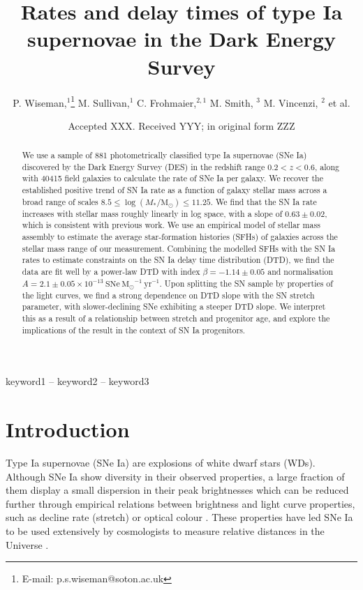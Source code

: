 \documentclass[fleqn,usenatbib]{mnras}
\title[Rates of SNe Ia in DES]{Rates and delay times of type Ia supernovae in the Dark Energy Survey}
\author[P. Wiseman et al.]{
P. Wiseman,$^{1}$\thanks{E-mail: p.s.wiseman@soton.ac.uk}
M. Sullivan,$^{1}$
C. Frohmaier,$^{2,1}$
M. Smith, $^{3}$
M. Vincenzi, $^{2}$
et al.
\\
}
\date{Accepted XXX. Received YYY; in original form ZZZ}
\begin{document}
\label{firstpage}
\pagerange{\pageref{firstpage}--\pageref{lastpage}}
\maketitle

\begin{abstract}
We use a sample of 881 photometrically classified type Ia supernovae (SNe Ia) discovered by the Dark Energy Survey (DES) in the redshift range $0.2 < z <0.6$, along with 40415 field galaxies to calculate the rate of SNe Ia per galaxy. We recover the established positive trend of SN Ia rate as a function of galaxy stellar mass across a broad range of scales $8.5 \leq \log(M_*/\mathrm{M}_{\odot}) \leq 11.25$. We find that the SN Ia rate increases with stellar mass roughly linearly in log space, with a slope of $0.63 \pm 0.02$, which is consistent with previous work. We use an empirical model of stellar mass assembly to estimate the average star-formation histories (SFHs) of galaxies across the stellar mass range of our measurement. Combining the modelled SFHs with the SN Ia rates to estimate constraints on the SN Ia delay time distribution (DTD), we find the data are fit well by a power-law DTD with index $\beta = -1.14 \pm 0.05$ and normalisation $A = 2.1 \pm0.05 \times 10^{-13}~\mathrm{SNe}~{\mathrm{M}_{\odot}}^{-1}~\mathrm{yr}^{-1}$. Upon splitting the SN sample by properties of the light curves, we find a strong dependence on DTD slope with the SN stretch parameter, with slower-declining SNe exhibiting a steeper DTD slope. We interpret this as a result of a relationship between stretch and progenitor age, and explore the implications of the result in the context of SN Ia progenitors.
\end{abstract}

\begin{keywords}
keyword1 -- keyword2 -- keyword3
\end{keywords}



\section{Introduction}

Type Ia supernovae (SNe Ia) are explosions of white dwarf stars (WDs). Although SNe Ia show diversity in their observed properties, a large fraction of them display a small dispersion in their peak brightnesses which can be reduced further through empirical relations between brightness and light curve properties, such as decline rate (stretch) or optical colour \citep{Rust1974,Pskovskii1977,Phillips1993,Tripp1998}. These properties have led SNe Ia to be used extensively by cosmologists to measure relative distances in the Universe \citep{Riess1998,Perlmutter1999}.
\end{document}
